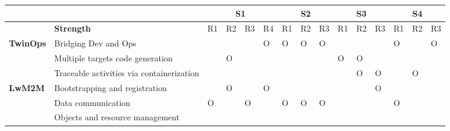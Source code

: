 \documentclass[journal,onecolumn]{IEEEtran} %
\begin{document}
\begin{table}[]
\centering
\begin{tabular}{|l|l|llll|lll|lll|lll|}
\hline
 &
   &
  \multicolumn{4}{c|}{\textbf{S1}} &
  \multicolumn{3}{c|}{\textbf{S2}} &
  \multicolumn{3}{c|}{\textbf{S3}} &
  \multicolumn{3}{c|}{\textbf{S4}} \\ \hline
 &
  \textbf{Strength} &
  \multicolumn{1}{l|}{R1} &
  \multicolumn{1}{l|}{R2} &
  \multicolumn{1}{l|}{R3} &
  R4 &
  \multicolumn{1}{l|}{R1} &
  \multicolumn{1}{l|}{R2} &
  R3 &
  \multicolumn{1}{l|}{R1} &
  \multicolumn{1}{l|}{R2} &
  R3 &
  \multicolumn{1}{l|}{R1} &
  \multicolumn{1}{l|}{R2} &
  R3 \\ \hline
\multirow{3}{*}{\textbf{TwinOps}} &
  Bridging Dev and Ops &
  \multicolumn{1}{l|}{} &
  \multicolumn{1}{l|}{} &
  \multicolumn{1}{l|}{} &
  O &
  \multicolumn{1}{l|}{O} &
  \multicolumn{1}{l|}{O} &
  O &
  \multicolumn{1}{l|}{} &
  \multicolumn{1}{l|}{} &
   &
  \multicolumn{1}{l|}{O} &
  \multicolumn{1}{l|}{} &
  O \\ \cline{2-15} 
 &
  Multiple targets code generation &
  \multicolumn{1}{l|}{} &
  \multicolumn{1}{l|}{O} &
  \multicolumn{1}{l|}{} &
   &
  \multicolumn{1}{l|}{} &
  \multicolumn{1}{l|}{} &
   &
  \multicolumn{1}{l|}{O} &
  \multicolumn{1}{l|}{O} &
   &
  \multicolumn{1}{l|}{} &
  \multicolumn{1}{l|}{} &
   \\ \cline{2-15} 
 &
  Traceable activities via containerization &
  \multicolumn{1}{l|}{} &
  \multicolumn{1}{l|}{} &
  \multicolumn{1}{l|}{} &
   &
  \multicolumn{1}{l|}{} &
  \multicolumn{1}{l|}{} &
   &
  \multicolumn{1}{l|}{} &
  \multicolumn{1}{l|}{O} &
  O &
  \multicolumn{1}{l|}{} &
  \multicolumn{1}{l|}{O} &
   \\ \hline
\multirow{3}{*}{\textbf{LwM2M}} &
  Bootstrapping and registration &
  \multicolumn{1}{l|}{} &
  \multicolumn{1}{l|}{O} &
  \multicolumn{1}{l|}{} &
  O &
  \multicolumn{1}{l|}{} &
  \multicolumn{1}{l|}{} &
   &
  \multicolumn{1}{l|}{} &
  \multicolumn{1}{l|}{} &
  O &
  \multicolumn{1}{l|}{} &
  \multicolumn{1}{l|}{} &
   \\ \cline{2-15} 
 &
  Data communication &
  \multicolumn{1}{l|}{O} &
  \multicolumn{1}{l|}{} &
  \multicolumn{1}{l|}{O} &
   &
  \multicolumn{1}{l|}{O} &
  \multicolumn{1}{l|}{O} &
  O &
  \multicolumn{1}{l|}{} &
  \multicolumn{1}{l|}{} &
   &
  \multicolumn{1}{l|}{O} &
  \multicolumn{1}{l|}{} &
   \\ \cline{2-15} 
 &
  Objects and resource management &
  \multicolumn{1}{l|}{} &
  \multicolumn{1}{l|}{} &

\end{tabular}
\end{table}
\end{document}
